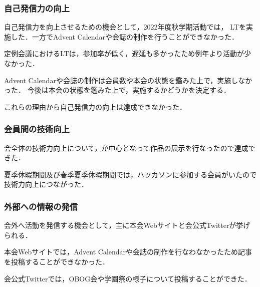 \subsubsection*{自己発信力の向上}
    自己発信力を向上させるための機会として，2022年度秋学期活動では，
    LTを実施した．一方でAdvent Calendarや会誌の制作を行うことができなかった．

    定例会議におけるLTは，参加率が低く，遅延も多かったため例年より活動が少なかった．

    Advent Calendarや会誌の制作は会員数や本会の状態を鑑みた上で，実施しなかった．
    今後は本会の状態を鑑みた上で，実施するかどうかを決定する．

    これらの理由から自己発信力の向上は達成できなかった．

\subsubsection*{会員間の技術向上}
    会全体の技術力向上について，\secondGrade{}が中心となって作品の展示を行なったので達成できた．

    夏季休暇期間及び春季夏季休暇期間では，ハッカソンに参加する会員がいたので技術力向上につながった．

\subsubsection*{外部への情報の発信}
    会外へ活動を発信する機会として，主に本会Webサイトと会公式Twitterが挙げられる．

    本会Webサイトでは，Advent Calendarや会誌の制作を行なわなかったため記事を投稿することができなかった．

    会公式Twitterでは，OBOG会や学園祭の様子について投稿することができた．